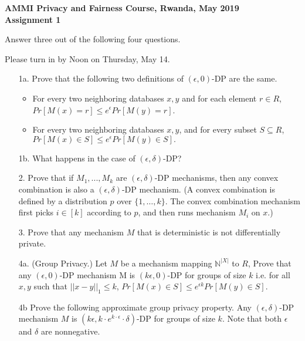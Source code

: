 \documentclass{article}
\begin{document}
\begin{center}

{\bf AMMI Privacy and Fairness Course, Rwanda, May 2019}\\

{\bf Assignment 1}\\

\end{center}

Answer three out of the following four questions.

Please turn in by Noon on Thursday, May 14.

\begin{itemize}

\item[1a.] Prove that 
the following two definitions of $(\epsilon,0)$-DP are the same.

\begin{itemize}

\item For every two neighboring databases $x,y$ and
for each element $r \in R$,
$Pr[M(x)=r] \leq e^{\epsilon} Pr[M(y)=r] $.


\item For every two neighboring databases $x,y$, and for every
subset $S \subseteq R$, $Pr[M(x) \in S] \leq e^{\epsilon} Pr[M(y)\in S] .$

\end{itemize}

\item[1b.] What happens in the case of $(\epsilon,\delta)$-DP?

\item[2.] Prove that if $M_1,...,M_k$ are $(\epsilon,\delta)$-DP mechanisms,
then any convex combination is also a $(\epsilon,\delta)$-DP mechanism.
(A convex combination is defined by a distribution $p$ over $\{1,\ldots,k\}$. 
The
convex combination mechanism first picks $i \in [k]$ according to $p$,
and then runs mechanism $M_i$ on $x$.)

\item[3.] Prove that any mechanism $M$ that is deterministic
is not differentially private.

\item[4a.] (Group Privacy.)
Let $M$ be a mechanism mapping $\mathbb{N}^{|X|}$ to $R$,
Prove that any $(\epsilon,0)$-DP mechanism M is
$(k\epsilon,0)$-DP
for groups of size $k$ i.e. for all $x,y$ such that
$||x - y||_1 \leq k$,
$Pr[M(x) \in S] \leq e^{\epsilon k} Pr[M(y) \in S]$.

\item[4b] Prove the following approximate group
privacy property. Any $(\epsilon,\delta)$-DP mechanism $M$
is $(k\epsilon, k \cdot e^{k\cdot \epsilon} \cdot \delta)$-DP
for groups of size $k$. Note that both $\epsilon$ and $\delta$ are nonnegative.

\end{itemize}
\end{document}
